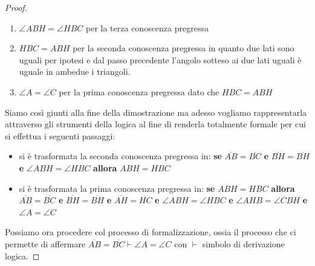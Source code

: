 \documentclass[a4paper]{book}
\begin{document}
\begin{proof}
\begin{enumerate}
\item $\angle ABH = \angle HBC$ per la terza conoscenza pregressa
\item $HBC = ABH$ per la seconda conoscenza pregressa in quanto due lati sono uguali per ipotesi e dal passo precedente
      l'angolo sotteso ai due lati uguali è uguale in ambedue i triangoli.
\item $\angle A= \angle C$ per la prima conoscenza pregressa dato che $HBC = ABH$
\end{enumerate}
Siamo così giunti alla fine della dimostrazione ma adesso vogliamo rappresentarla attraverso gli strumenti della logica al fine di renderla
totalmente formale per cui si effettua i seguenti passaggi:
\begin{itemize}
\item si è trasformata la seconda conoscenza pregressa in:\newline
  \textbf{se} $\overline{AB}=\overline{BC}$ \textbf{e} $\overline{BH}=\overline{BH}$ \textbf{e} $\angle ABH = \angle HBC$
  \textbf{allora} $ABH = HBC$
\item si è trasformata la prima conoscenza pregressa in:\newline
  \textbf{se} $ABH = HBC$ \textbf{allora} $\overline{AB}=\overline{BC}$ \textbf{e} $\overline{BH}=\overline{BH}$
  \textbf{e} $\overline{AH}=\overline{HC}$ \textbf{e} $\angle ABH = \angle HBC$ \textbf{e} $\angle AHB = \angle CBH$ \textbf{e} $\angle A=\angle C$
\end{itemize}
Possiamo ora procedere col processo di formalizzazione, ossia il processo che ci permette di affermare
$\overline{AB} = \overline{BC} \vdash \angle A = \angle C$ con $\vdash$ simbolo di derivazione logica.


\end{proof}
\end{document}
